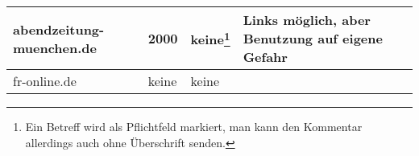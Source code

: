 \begin{longtable}{p{28mm}p{17mm}p{20mm}p{65mm}}
    abendzeitung-muenchen.de
    & 2000
    & keine\footnote{Ein Betreff wird als Pflichtfeld markiert, man kann den Kommentar allerdings auch ohne Überschrift
      senden.}
    & Links möglich, aber Benutzung auf eigene Gefahr
    
      \\*\midrule

    fr-online.de
    & keine
    & keine
    & 

  \end{longtable}
\endgroup

